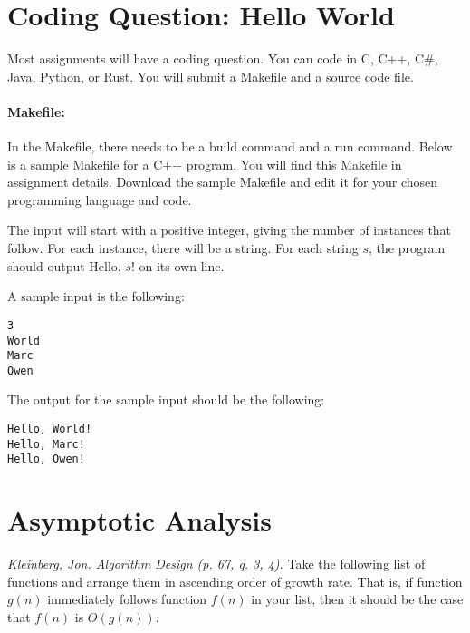 \documentclass[solutionorbox,answers]{exam}
\begin{document}
\begin{questions}
\section*{Coding Question: Hello World}

Most assignments will have a coding question. You can code in C, C++, C\#, Java, Python, or Rust. You will submit a Makefile and a source code file.
\vspace{-0.5cm}

\paragraph{Makefile:} In the Makefile, there needs to be a build command and a run command. Below is a sample Makefile for a C++ program. You will find this Makefile in assignment details. Download the sample Makefile and edit it for your chosen programming language and code.



\newpage
{}

The input will start with a positive integer, giving the number of instances that follow. For each instance, there will be a string. For each string $s$, the program should output Hello, $s$! on its own line.

A sample input is the following:
\begin{verbatim}
3
World
Marc
Owen
\end{verbatim}

The output for the sample input should be the following:
\begin{verbatim}
Hello, World!
Hello, Marc!
Hello, Owen!
\end{verbatim}

\section*{Asymptotic Analysis}

  \question \textit{Kleinberg, Jon. Algorithm Design (p. 67, q. 3, 4).} Take the following list of functions and arrange them in ascending order of growth rate. That is, if function $g(n)$ immediately follows function $f(n)$ in your list, then it should be the case that $f(n)$ is $O(g(n))$. 

\begin{parts}

\end{parts}
\end{questions}
\end{document}
